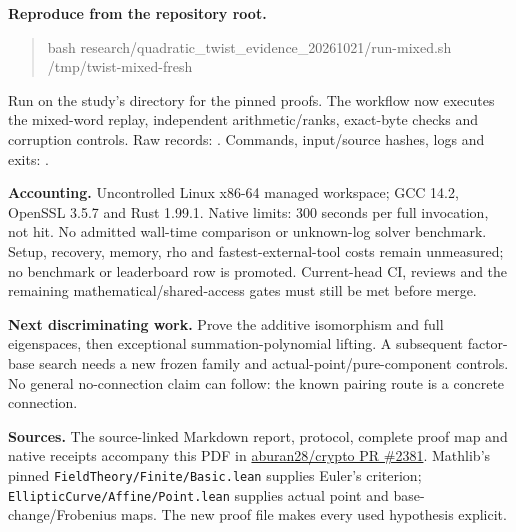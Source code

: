 \documentclass[10pt]{article}
\begin{document}
\textbf{Reproduce from the repository root.}
\begin{quote}\small\ttfamily
bash research/quadratic\_twist\_evidence\_20261021/run-mixed.sh /tmp/twist-mixed-fresh
\end{quote}
Run  on the study's  directory
for the pinned proofs. The workflow now executes the mixed-word replay,
independent arithmetic/ranks, exact-byte checks and corruption controls.
Raw records: .
Commands, input/source hashes, logs and exits:
.

\textbf{Accounting.} Uncontrolled Linux x86-64 managed workspace; GCC 14.2,
OpenSSL 3.5.7 and Rust 1.99.1. Native limits: 300 seconds per full invocation,
not hit. No admitted wall-time comparison or unknown-log solver benchmark.
Setup, recovery, memory, rho and fastest-external-tool costs remain unmeasured;
no benchmark or leaderboard row is promoted. Current-head CI, reviews and the
remaining mathematical/shared-access gates must still be met before merge.

\textbf{Next discriminating work.} Prove the additive isomorphism and full
eigenspaces, then exceptional summation-polynomial lifting. A subsequent
factor-base search needs a new frozen family and actual-point/pure-component
controls. No general no-connection claim can follow: the known pairing route
is a concrete connection.

\textbf{Sources.} The source-linked Markdown report, protocol, complete proof
map and native receipts accompany this PDF in
\href{https://github.com/aburan28/crypto/pull/2381}{aburan28/crypto PR \#2381}.
Mathlib's pinned \texttt{FieldTheory/Finite/Basic.lean} supplies Euler's
criterion; \texttt{EllipticCurve/Affine/Point.lean} supplies actual point and
base-change/Frobenius maps. The new proof file makes every used hypothesis explicit.
\end{document}
